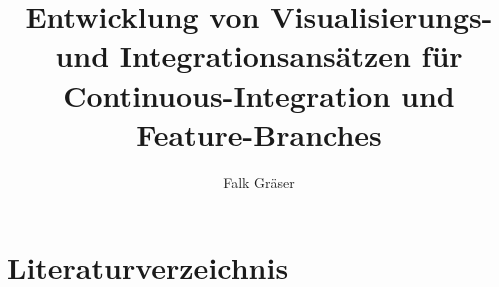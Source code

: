 \documentclass[12pt,a4paper]{book}
\author{Falk Gräser}
\title{Entwicklung von Visualisierungs- und Integrationsansätzen für Continuous-Integration und Feature-Branches}
\begin{document}
\maketitle

\tableofcontents









\chapter{Literaturverzeichnis}

\printbibliography
\end{document}
